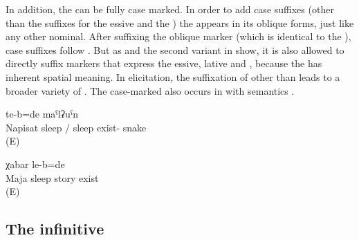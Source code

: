 In addition, the  can be fully case marked. In order to add case suffixes (other than the suffixes for the essive and the ) the  appears in its oblique forms, just like any other nominal. After suffixing the oblique marker  (which is identical to the ), case suffixes follow . But as  and the second variant in  show, it is also allowed to directly suffix markers that express the  essive, lative and , because the  has inherent spatial meaning. In elicitation, the suffixation of other than  leads to a broader variety of  . The case-marked  also occurs in  with  semantics .
%
\begin{exe}
	\ex	\label{ex:‎‎‎Where Napisat was sleeping there was a snake}
		te-b=de	maˁlʡuˁn\\
		Napisat	sleep	/ sleep	exist-	snake\\
	\glt	{} (E)

	\ex	\label{ex:‎ ‎‎There was the gossip that Maja was lying}
		χabar	le-b=de\\
		Maja	sleep	story	exist\\
	\glt	{} (E)
\end{exe}



\subsection{The infinitive}
\label{ssec:The infinitive}

